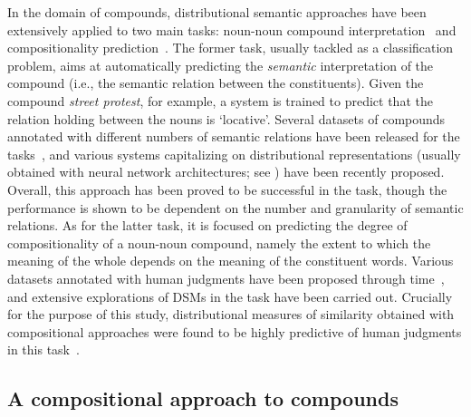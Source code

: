 \documentclass[output=paper]{langsci/langscibook}
\begin{document}
In the domain of compounds, distributional semantic approaches have been extensively applied to two main tasks: noun-noun compound interpretation~\citep{van2013melodi,dima2015automatic,dima2016compositionality,P18-1111,fares2018transfer} and compositionality prediction~\citep{reddy2011empirical,im2013exploring,salehi2014using,salehi2015word,cordeiro2016predicting}. The former task, usually tackled as a classification problem, aims at automatically predicting the \emph{semantic} interpretation of the compound (i.e., the semantic relation between the constituents). Given the compound \emph{street protest}, for example, a system is trained to predict that the relation holding between the nouns is `locative'. Several datasets of compounds annotated with different numbers of semantic relations have been released for the tasks~\citep{o2007annotating,tratz2010taxonomy}, and various systems capitalizing on distributional representations (usually obtained with neural network architectures; see ) have been recently proposed. Overall, this approach has been proved to be successful in the task, though the performance is shown to be dependent on the number and granularity of semantic relations. As for the latter task, it is focused on predicting the degree of compositionality of a noun-noun compound, namely the extent to which the meaning of the whole depends on the meaning of the constituent words. Various datasets annotated with human judgments have been proposed through time~\citep{reddy2011empirical,roller2013expected,farahmand2015multiword}, and extensive explorations of DSMs in the task have been carried out. Crucially for the purpose of this study, distributional measures of similarity obtained with compositional approaches were found to be highly predictive of human judgments in this task~\citep{reddy2011empirical,im2013exploring,salehi2015word,cordeiro2016predicting}.

\subsection{A compositional approach to compounds}\label{sec:compapp}
\end{document}
